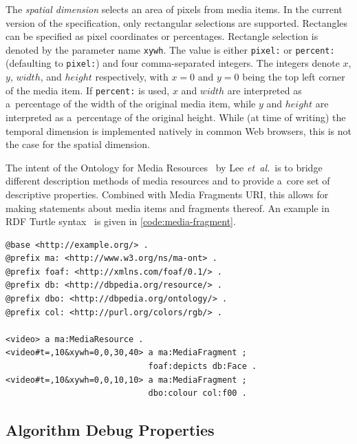 The \emph{spatial dimension} selects an area of pixels from media items.
In the current version of the specification,
only rectangular selections are supported.
Rectangles can be specified as pixel coordinates or percentages.
Rectangle selection is denoted by the parameter name \texttt{xywh}.
The value is either \texttt{pixel:} or \texttt{percent:}
(defaulting to \texttt{pixel:}) and four comma-separated integers.
The integers denote $x$, $y$, $width$, and $height$ respectively,
with $x = 0$ and $y = 0$ being the top left corner of the media item.
If \texttt{percent:} is used,
$x$ and $width$ are interpreted as a~percentage of the width of the original media item,
while $y$ and $height$ are interpreted as a~percentage of the original height.
While (at time of writing) the temporal dimension is implemented natively
in common Web browsers, this is not the case for the spatial dimension.

The intent of the Ontology for Media Resources~\cite{lee2012mediaontology}
by Lee \emph{et~al.}\ is to bridge different description methods of media resources
and to provide a~core set of descriptive properties.
Combined with Media Fragments URI, this allows for making statements
about media items and fragments thereof.
An example in RDF Turtle syntax~\cite{prudhommeaux2013turtle}
is given in \autoref{code:media-fragment}.

\begin{lstlisting}[caption={[Description of two 10~sec long media fragments]{Description of two 10~sec long media fragments:
  \textit{(i)}~a~tile of dimensions $ 30 \times 40 $ pixels
  starting at pixel coordinates $ (0, 0) $
  that contains a~face; and
  \textit{(ii)}~a~tile of dimensions $ 10 \times 10 $ pixels
  starting at pixel coordinates $ (0, 0) $ of red color}},
  label=code:media-fragment, float=!h]
@base <http://example.org/> .
@prefix ma: <http://www.w3.org/ns/ma-ont> .
@prefix foaf: <http://xmlns.com/foaf/0.1/> .
@prefix db: <http://dbpedia.org/resource/> .
@prefix dbo: <http://dbpedia.org/ontology/> .
@prefix col: <http://purl.org/colors/rgb/> .

<video> a ma:MediaResource .
<video#t=,10&xywh=0,0,30,40> a ma:MediaFragment ;
                             foaf:depicts db:Face .
<video#t=,10&xywh=0,0,10,10> a ma:MediaFragment ;
                             dbo:colour col:f00 .
\end{lstlisting}

\subsection{Algorithm Debug Properties}
\label{sec:media-item-deduplication-algorithm}

